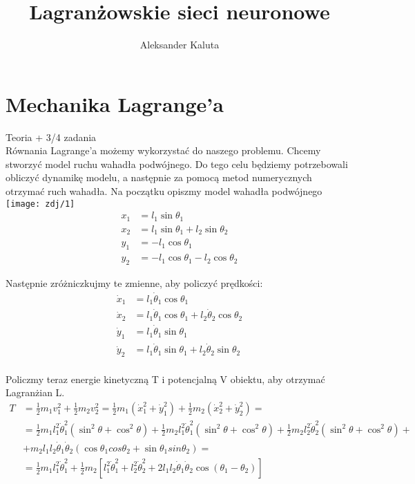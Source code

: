 \documentclass[]{article}
\title{Lagranżowskie sieci neuronowe}
\author{Aleksander Kaluta}
\begin{document}
	
	\maketitle
	
	\section{Mechanika Lagrange'a}
	Teoria + 3/4 zadania\\
	
	Równania Lagrange'a możemy wykorzystać do naszego problemu. Chcemy stworzyć model ruchu wahadła podwójnego. Do tego celu będziemy potrzebowali obliczyć dynamikę modelu, a następnie za pomocą metod numerycznych otrzymać ruch wahadła. Na początku opiszmy model wahadła podwójnego
	\\
	\texttt{[image: zdj/1]}
	\\
	\begin{align*}
		x_1 &= l_1 \sin \theta_1 \\
		x_2 &= l_1 \sin \theta_1 + l_2 \sin \theta_2 \\
		y_1 &= -l_1 \cos \theta_1 \\
		y_2 &= -l_1 \cos \theta_1 - l_2 \cos \theta_2
	\end{align*}
	
	Następnie zróżniczkujmy te zmienne, aby policzyć prędkości:
	\begin{align*}
		\dot{x}_1 &= l_1 \dot{\theta}_1 \cos \theta_1 \\
		\dot{x}_2 &= l_1 \dot{\theta}_1 \cos \theta_1 + l_2 \dot{\theta}_2 \cos \theta_2 \\
		\dot{y}_1 &= l_1 \dot{\theta}_1 \sin \theta_1 \\
		\dot{y}_2 &= l_1 \dot{\theta}_1 \sin \theta_1 + l_2 \dot{\theta}_2 \sin \theta_2
	\end{align*}
	\\
	Policzmy teraz energie kinetyczną T i potencjalną V obiektu, aby otrzymać Lagranżian L.\\
	\begin{align*}
		T &= \frac{1}{2} m_1 v_1^2 + \frac{1}{2} m_2 v_2^2 
		= \frac{1}{2} m_1 (\dot{x}_1^2 + \dot{y}_1^2) + \frac{1}{2} m_2 (\dot{x}_2^2 + \dot{y}_2^2)= \\
		&= \frac{1}{2} m_1 l_1^2 \dot{\theta}_1^2(\sin^2\theta+\cos^2\theta) + \frac{1}{2} m_2  l_1^2 \dot{\theta}_1^2(\sin^2\theta+\cos^2\theta) + \frac{1}{2} m_2 l_2^2 \dot{\theta}_2^2(\sin^2\theta+\cos^2\theta) +\\
		&+ m_2 l_1 l_2 \dot{\theta}_1 \dot{\theta}_2 (\cos\theta_1 cos\theta_2+\sin\theta_1 sin\theta_2)=
		 \\
		&= \frac{1}{2} m_1 l_1^2 \dot{\theta}_1^2 + \frac{1}{2} m_2 \left[ l_1^2 \dot{\theta}_1^2 + l_2^2 \dot{\theta}_2^2 + 2 l_1 l_2 \dot{\theta}_1 \dot{\theta}_2 \cos(\theta_1 - \theta_2) \right]
	\end{align*}
	
\end{document}
